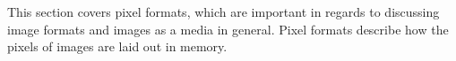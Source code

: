 This section covers pixel formats, which are important in regards to discussing image formats and images as a media in general. Pixel formats describe how the pixels of images are laid out in memory. 